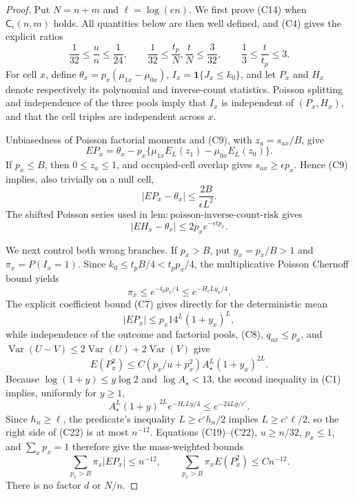 \documentclass{article}
\begin{document}
\begin{proof}
Put \(N=n+m\) and \(\ell=\log(en)\).  We first prove (C14) when \(\mathsf C_\epsilon(n,m)\) holds.  All quantities below are then well defined, and (C4) gives the explicit ratios
\[
 \frac1{32}\le\frac un\le\frac1{24},\qquad
 \frac1{32}\le\frac{t_p}N,\frac tN\le\frac3{32},
 \qquad \frac13\le\frac t{t_p}\le3.                               \tag{C15}
\]
For cell \(x\), define \(\theta_x=p_x(\mu_{1x}-\mu_{0x})\), \(I_x=\mathbf1\{J_x\le k_0\}\), and let \(P_x\) and \(H_x\) denote respectively its polynomial and inverse-count statistics.  Poisson splitting and independence of the three pools imply that \(I_x\) is independent of \((P_x,H_x)\), and that the cell triples are independent across \(x\).

Unbiasedness of Poisson factorial moments and (C9), with \(z_a=s_{ax}/B\), give
\[
 EP_x=\theta_x-p_x\{\mu_{1x}E_L(z_1)-\mu_{0x}E_L(z_0)\}.             \tag{C16}
\]
If \(p_x\le B\), then \(0\le z_a\le1\), and occupied-cell overlap gives \(s_{ax}\ge\epsilon p_x\).  Hence (C9) implies, also trivially on a null cell,
\[
 |EP_x-\theta_x|\le\frac{2B}{\epsilon L^2}.                         \tag{C17}
\]
The shifted Poisson series used in \(\mathrm{lem:poisson\mbox{-}inverse\mbox{-}count\mbox{-}risk}\) gives
\[
 |EH_x-\theta_x|\le2p_xe^{-\epsilon tp_x}.                         \tag{C18}
\]

We next control both wrong branches.  If \(p_x>B\), put \(y_x=p_x/B>1\) and \(\pi_x=P(I_x=1)\).  Since \(k_0\le t_pB/4<t_pp_x/4\), the multiplicative Poisson Chernoff bound yields
\[
 \pi_x\le e^{-t_pp_x/4}\le e^{-H_\epsilon Ly_x/4}.                 \tag{C19}
\]
The explicit coefficient bound (C7) gives directly for the deterministic mean
\[
 |EP_x|\le p_x14^L(1+y_x)^L,                                      \tag{C20}
\]
while independence of the outcome and factorial pools, (C8), \(q_{ax}\le p_x\), and \(\operatorname{Var}(U-V)\le2\operatorname{Var}(U)+2\operatorname{Var}(V)\) give
\[
 E(P_x^2)\le C(p_x/u+p_x^2)A_\star^L(1+y_x)^{2L}.                  \tag{C21}
\]
Because \(\log(1+y)\le y\log2\) and \(\log A_\star<13\), the second inequality in (C1) implies, uniformly for \(y\ge1\),
\[
 A_\star^L(1+y)^{2L}e^{-H_\epsilon Ly/4}
 \le e^{-24Ly/c^\circ}.                                           \tag{C22}
\]
Since \(h_n\ge\ell\), the predicate's inequality \(L\ge c^\circ h_n/2\) implies \(L\ge c^\circ\ell/2\), so the right side of (C22) is at most \(n^{-12}\).  Equations (C19)--(C22), \(u\ge n/32\), \(p_x\le1\), and \(\sum_xp_x=1\) therefore give the mass-weighted bounds
\[
 \sum_{p_x>B}\pi_x|EP_x|\le n^{-12},
 \qquad
 \sum_{p_x>B}\pi_xE(P_x^2)\le Cn^{-12}.                          \tag{C23}
\]
There is no factor \(d\) or \(N/n\).


\end{proof}
\end{document}
